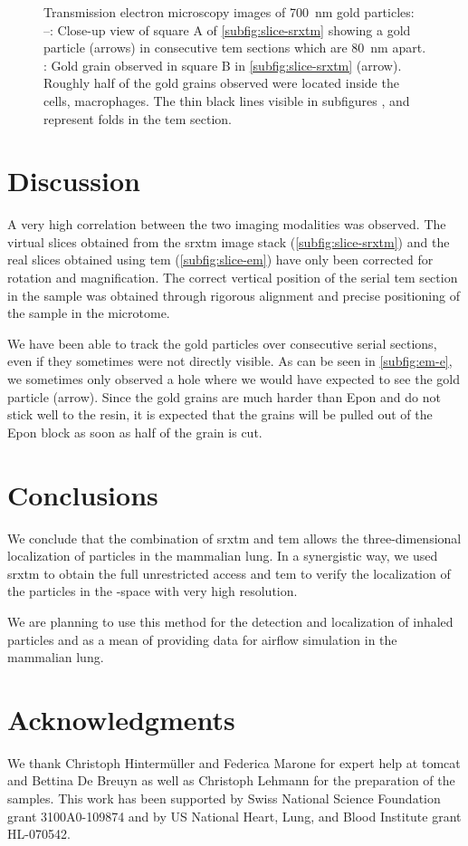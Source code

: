 \begin{figure}[htb]
{		\label{subfig:em-f}%
		}%
	\caption[\acs{tem} images of gold particles]{Transmission electron microscopy images of \SI{700}{\nano\meter} gold particles: --: Close-up view of square A of \autoref{subfig:slice-srxtm} showing a gold particle (arrows) in consecutive \ac{tem} sections which are \SI{80}{\nano\meter} apart. : Gold grain observed in square B in \autoref{subfig:slice-srxtm} (arrow). Roughly half of the gold grains observed were located inside the cells, \eg macrophages. The thin black lines visible in subfigures ,  and  represent folds in the \ac{tem} section.}%
	\label{fig:srxtm-em}%
\end{figure}

\section{Discussion}
A very high correlation between the two imaging modalities was observed. The virtual slices obtained from the \ac{srxtm} image stack (\autoref{subfig:slice-srxtm}) and the real slices obtained using \ac{tem} (\autoref{subfig:slice-em}) have only been corrected for rotation and magnification. The correct vertical position of the serial \ac{tem} section in the sample was obtained through rigorous alignment and precise positioning of the sample in the microtome.

We have been able to track the gold particles over consecutive serial sections, even if they sometimes were not directly visible. As can be seen in \autoref{subfig:em-e}, we sometimes only observed a hole where we would have expected to see the gold particle (arrow). Since the gold grains are much harder than Epon and do not stick well to the resin, it is expected that the grains will be pulled out of the Epon block as soon as half of the grain is cut.

\section{Conclusions}
We conclude that the combination of \ac{srxtm} and \ac{tem} allows the three-dimensional localization of particles in the mammalian lung. In a synergistic way, we used \ac{srxtm} to obtain the full unrestricted \threed access and \ac{tem} to verify the localization of the particles in the \threed-space with very high resolution. 

We are planning to use this method for the detection and localization of inhaled particles and as a mean of providing data for airflow simulation in the mammalian lung.

\section{Acknowledgments}
We thank Christoph Hinterm\"uller and Federica Marone for expert help at \ac{tomcat} and Bettina De Breuyn as well as Christoph Lehmann for the preparation of the samples. This work has been supported by Swiss National Science Foundation grant 3100A0-109874 and by US National Heart, Lung, and Blood Institute grant HL-070542.

